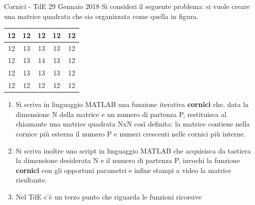 \documentclass[aspectratio=169, ]{beamer}
\begin{document}
\begin{frame}[allowframebreaks]{Cornici - TdE 29 Gennaio 2018}
    Si consideri il seguente problema: si vuole creare una matrice quadrata che sia organizzata come quella in figura.

    \begin{tabular}{|c|c|c|c|c|}
        \hline
        12 & 12 & 12 & 12 & 12 \\
        \hline
        12 & 13 & 13 & 13 & 12 \\
        \hline
        12 & 13 & 14 & 13 & 12 \\
        \hline
        12 & 13 & 13 & 13 & 12 \\
        \hline
        12 & 12 & 12 & 12 & 12 \\
        \hline
    \end{tabular}

    \begin{enumerate}
        \item Si scriva in linguaggio MATLAB una funzione \alert{iterativa} \textbf{cornici} che, data la dimensione N della matrice e un numero di partenza P, restituisca al chiamante una matrice quadrata NxN così definita: la matrice contiene nella cornice più esterna il numero P e numeri crescenti nelle cornici più interne.

        \item Si scriva inoltre uno script in linguaggio MATLAB che acquisisca da tastiera la dimensione desiderata N e il numero di partenza P, invochi la funzione \textbf{cornici} con gli opportuni parametri e infine stampi a video la matrice risultante.

        \item Nel TdE c'è un terzo punto che riguarda le funzioni ricorsive
    \end{enumerate}
\end{frame}
\end{document}
